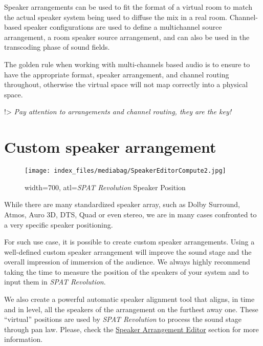 \documentclass[
  letterpaper,
  DIV=11,
  numbers=noendperiod]{scrreport}
\begin{document}
Speaker arrangements can be used to fit the format of a virtual room to
match the actual speaker system being used to diffuse the mix in a real
room. Channel-based speaker configurations are used to define a
multichannel source arrangement, a room speaker source arrangement, and
can also be used in the transcoding phase of sound fields.

The golden rule when working with multi-channels based audio is to
ensure to have the appropriate format, speaker arrangement, and channel
routing throughout, otherwise the virtual space will not map correctly
into a physical space.

!\textgreater{} \emph{Pay attention to arrangements and channel routing,
they are the key!}

\hypertarget{custom-speaker-arrangement}{%
\section{Custom speaker arrangement}\label{custom-speaker-arrangement}}

\begin{figure}

{\centering \texttt{[image: index\_files/mediabag/SpeakerEditorCompute2.jpg]}

}

\caption{width=700, atl=\emph{SPAT Revolution} Speaker Position}

\end{figure}

While there are many standardized speaker array, such as Dolby Surround,
Atmos, Auro 3D, DTS, Quad or even stereo, we are in many cases
confronted to a very specific speaker positioning.

For such use case, it is possible to create custom speaker arrangements.
Using a well-defined custom speaker arrangement will improve the sound
stage and the overall impression of immersion of the audience. We always
highly recommend taking the time to measure the position of the speakers
of your system and to input them in \emph{SPAT Revolution}.

We also create a powerful automatic speaker alignment tool that aligns,
in time and in level, all the speakers of the arrangement on the
furthest away one. These ``virtual'' positions are used by \emph{SPAT
Revolution} to process the sound stage through pan law. Please, check
the \href{Spat_Environment_Speaker_Arrangement_Editor.md}{Speaker
Arrangement Editor} section for more information.
\end{document}
